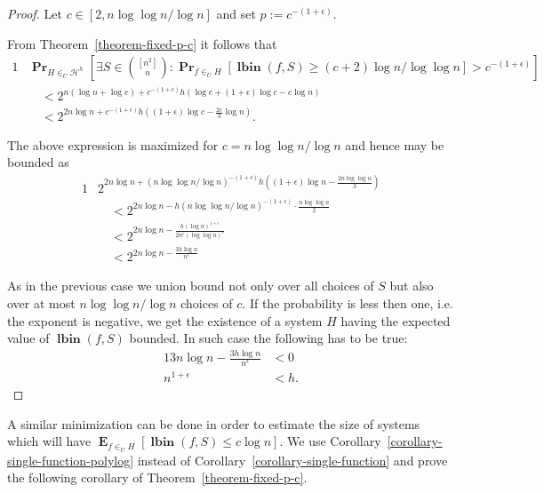 \documentclass{article}
\newcommand{\lbin}[2]{\operatorname{\mathbf{lbin}}({#1}, {#2})}
\newcommand{\probs}[2]{\operatorname{\mathbf{Pr}}_{{#1}}\left[{#2}\right]}
\newcommand{\expects}[2]{\operatorname{\mathbf{E}}_{{#1}}\left[{#2}\right]}
\begin{document}
\begin{proof}
Let $c \in [2, n \log \log n / \log n]$ and set $p := c^{-(1 + \epsilon)}$.

From Theorem~\ref{theorem-fixed-p-c} it follows that
\begin{alignat*}{1}
& \probs{H \in_U \mathcal{H}^h}{\exists S \in \binom{[n^2]}{n} \colon \probs{f \in_U H}{\lbin{f}{S} \geq (c + 2) \log n / \log \log n} > c^{-(1 + \epsilon)}} \\ 
& \quad < 2^{n(\log n + \log e) + c^{-(1 + \epsilon)}h(\log e + (1 + \epsilon)\log{c} - c \log n)} \\
& \quad < 2^{2n\log n + c^{-(1 + \epsilon)}h((1 + \epsilon)\log c - \frac{2c}{3} \log n)}.
\end{alignat*}

The above expression is maximized for $c = n \log \log n / \log n$ and hence may be bounded as
\begin{alignat*}{1}
& 2^{2n\log n + (n \log \log n / \log n)^{-(1 + \epsilon)}h((1 + \epsilon)\log n - \frac{2n \log \log n}{3})} \\ 
	& \quad < 2^{2n \log n - h(n\log \log n / \log n)^{-(1 + \epsilon)} \cdot \frac{n \log \log n}{2}} \\
	& \quad < 2^{2n \log n - \frac{h(\log n)^{1 + \epsilon}}{2n^\epsilon (\log \log n)^\epsilon}} \\
	& \quad < 2^{2n \log n - \frac{3h\log n}{n^\epsilon}}
\end{alignat*}

As in the previous case we union bound not only over all choices of $S$ but also over at most $n \log \log n / \log n$ choices of $c$. If the probability is less then one, i.e. the exponent is negative, we get the existence of a system $H$ having the expected value of $\lbin{f}{S}$ bounded. In such case the following has to be true:
\begin{alignat*}{1}
3n \log n - \frac{3h \log n}{n^\epsilon} & < 0 \\
n^{1 + \epsilon} & < h.
\end{alignat*}
\end{proof}

A similar minimization can be done in order to estimate the size of systems which will have $\expects{f \in_U H}{\lbin{f}{S} \leq c \log n}$.
We use Corollary~\ref{corollary-single-function-polylog} instead of Corollary~\ref{corollary-single-function} and prove the following corollary of Theorem~\ref{theorem-fixed-p-c}.
\end{document}
